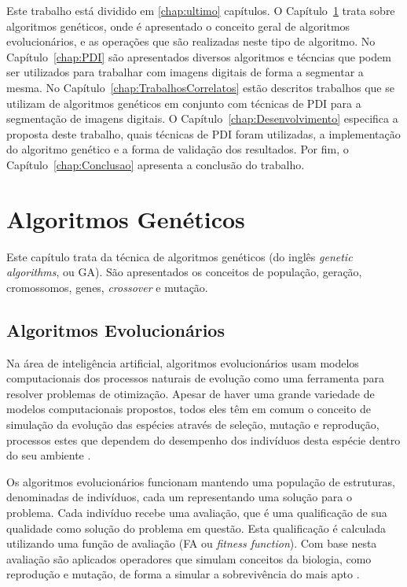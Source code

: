 \documentclass[12pt,oneside,a4paper,english,french,spanish,brazil,]{abntex2}
\begin{document}
Este trabalho está dividido em \ref{chap:ultimo} capítulos. O Capítulo~\ref{chap:AlgoritmosGeneticos} trata sobre algoritmos genéticos, onde é apresentado o conceito geral de algoritmos evolucionários, e as operações que são realizadas neste tipo de algoritmo. No Capítulo~\ref{chap:PDI} são apresentados diversos algoritmos e técncias que podem ser utilizados para trabalhar com imagens digitais de forma a segmentar a mesma. No Capítulo~\ref{chap:TrabalhosCorrelatos} estão descritos trabalhos que se utilizam de algoritmos genéticos em conjunto com técnicas de PDI para a segmentação de imagens digitais. O Capítulo~\ref{chap:Desenvolvimento} especifica a proposta deste trabalho, quais técnicas de PDI foram utilizadas, a implementação do algoritmo genético e a forma de validação dos resultados. Por fim, o Capítulo~\ref{chap:Conclusao} apresenta a conclusão do trabalho.

\chapter{Algoritmos Genéticos}
\label{chap:AlgoritmosGeneticos}

Este capítulo trata da técnica de algoritmos genéticos (do inglês \textit{genetic algorithms}, ou GA). São apresentados os conceitos de população, geração, cromossomos, genes, \textit{crossover} e mutação.

\section{Algoritmos Evolucionários}

Na área de inteligência artificial, algoritmos evolucionários usam modelos computacionais dos processos naturais de evolução como uma ferramenta para resolver problemas de otimização. Apesar de haver uma grande variedade de modelos computacionais propostos, todos eles têm em comum o conceito de simulação da evolução das espécies através de seleção, mutação e reprodução, processos estes que dependem do desempenho dos indivíduos desta espécie dentro do seu ambiente \cite{linden:2008}.

Os algoritmos evolucionários funcionam mantendo uma população de estruturas, denominadas de indivíduos, cada um representando uma solução para o problema. Cada indivíduo recebe uma avaliação, que é uma qualificação de sua qualidade como solução do problema em questão. Esta qualificação é calculada utilizando uma função de avaliação (FA ou \textit{fitness function}). Com base nesta avaliação são aplicados operadores que simulam conceitos da biologia, como reprodução e mutação, de forma a simular a sobrevivência do mais apto \cite{linden:2008}.
\end{document}
